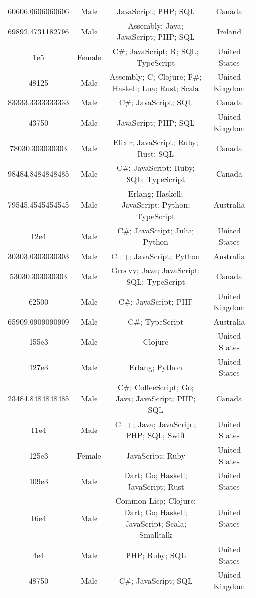 \begin{center}
\begin{tabular}{ |c|c|c|c| }
60606.0606060606  &  Male  &  JavaScript; PHP; SQL  &  Canada  \\ 
69892.4731182796  &  Male  &  Assembly; Java; JavaScript; PHP; SQL  &  Ireland  \\ 
1e5  &  Female  &  C\#; JavaScript; R; SQL; TypeScript  &  United States  \\ 
48125  &  Male  &  Assembly; C; Clojure; F\#; Haskell; Lua; Rust; Scala  &  United Kingdom  \\ 
83333.3333333333  &  Male  &  C\#; JavaScript; SQL  &  Canada  \\ 
43750  &  Male  &  JavaScript; PHP; SQL  &  United Kingdom  \\ 
78030.303030303  &  Male  &  Elixir; JavaScript; Ruby; Rust; SQL  &  Canada  \\ 
98484.8484848485  &  Male  &  C\#; JavaScript; Ruby; SQL; TypeScript  &  Canada  \\ 
79545.4545454545  &  Male  &  Erlang; Haskell; JavaScript; Python; TypeScript  &  Australia  \\ 
12e4  &  Male  &  C\#; JavaScript; Julia; Python  &  United States  \\ 
30303.0303030303  &  Male  &  C++; JavaScript; Python  &  Australia  \\ 
53030.303030303  &  Male  &  Groovy; Java; JavaScript; SQL; TypeScript  &  Canada  \\ 
62500  &  Male  &  C\#; JavaScript; PHP  &  United Kingdom  \\ 
65909.0909090909  &  Male  &  C\#; TypeScript  &  Australia  \\ 
155e3  &  Male  &  Clojure  &  United States  \\ 
127e3  &  Male  &  Erlang; Python  &  United States  \\ 
23484.8484848485  &  Male  &  C\#; CoffeeScript; Go; Java; JavaScript; PHP; SQL  &  Canada  \\ 
11e4  &  Male  &  C++; Java; JavaScript; PHP; SQL; Swift  &  United States  \\ 
125e3  &  Female  &  JavaScript; Ruby  &  United States  \\ 
109e3  &  Male  &  Dart; Go; Haskell; JavaScript; Rust  &  United States  \\ 
16e4  &  Male  &  Common Lisp; Clojure; Dart; Go; Haskell; JavaScript; Scala; Smalltalk  &  United States  \\ 
4e4  &  Male  &  PHP; Ruby; SQL  &  United States  \\ 
48750  &  Male  &  C\#; JavaScript; SQL  &  United Kingdom  \\ 

\end{tabular}
\end{center}
